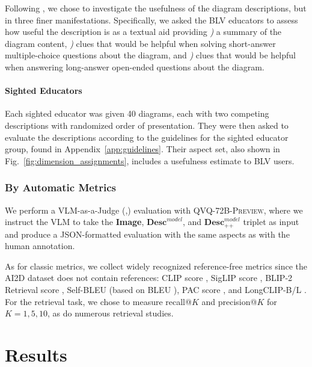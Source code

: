 Following \citet{tang2023vistext,9555469}, we chose to investigate the usefulness of the diagram descriptions, but in three finer manifestations. Specifically, we asked the BLV educators to assess how useful the description is as a textual aid providing \textit{)} a summary of the diagram content, \textit{)} clues that would be helpful when solving short-answer multiple-choice questions about the diagram, and \textit{)} clues that would be helpful when answering long-answer open-ended questions about the diagram.

\paragraph{Sighted Educators}

Each sighted educator was given 40 diagrams, each with two competing descriptions with randomized order of presentation. They were then asked to evaluate the descriptions according to the guidelines for the sighted educator group, found in Appendix~\ref{app:guidelines}. Their aspect set, also shown in Fig.~\ref{fig:dimension_assignments}, includes a usefulness estimate to BLV users.

\subsubsection{By Automatic Metrics}
We perform a VLM-as-a-Judge (\citet{dubois2023alpacafarm},\citet{zheng2023judgingllm}) evaluation with \textsc{QVQ-72B-Preview}, where we instruct the VLM to take the \textbf{Image}, $\textbf{Desc}^{model}_{}$, and $\textbf{Desc}^{model}_{\texttt{++}}$ triplet as input and produce a JSON-formatted evaluation with the same aspects as with the human annotation.

As for classic metrics, we collect widely recognized reference-free metrics since the AI2D dataset does not contain references: CLIP score \citep{hessel2021clipscore}, SigLIP score \citep{zhai2023sigmoid}, BLIP-2 Retrieval score \citep{li2023blip}, Self-BLEU (based on BLEU \citep{papineni2002bleu}), PAC score \citep{sarto2023positive}, and LongCLIP-B/L \citep{zhang2024longclip}. For the retrieval task, we chose to measure recall@$K$ and precision@$K$ for $K=1, 5, 10$, as do numerous retrieval studies.

\section{Results}\label{sec:november}

